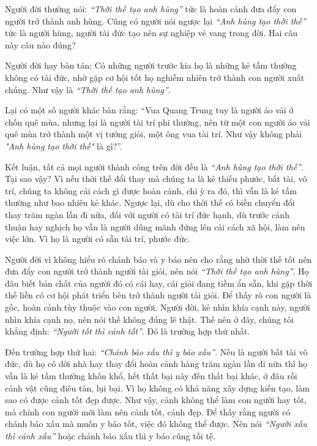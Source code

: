 \documentclass[
  12pt,
  oneside]{book}
\begin{document}
Người đời thường nói: \emph{``Thời thế tạo anh hùng''} tức là hoàn cảnh đưa đẩy con người trở thành anh hùng. Cũng có người nói ngược lại \emph{``Anh hùng tạo thời thế''} tức là người hùng, người tài đức tạo nên sự nghiệp vẻ vang trong đời. Hai câu này câu nào đúng?

Người đời hay bàn tán: Có những người trước kia họ là những kẻ tầm thường không có tài đức, nhờ gặp cơ hội tốt họ nghiễm nhiên trở thành con người xuất chúng. Như vậy là \emph{``Thời thế tạo anh hùng''}.

Lại có một số người khác bàn rằng: ``Vua Quang Trung tuy là người áo vải ở chốn quê mùa, nhưng lại là người tài trí phi thường, nên từ một con người áo vải quê mùa trở thành một vị tướng giỏi, một ông vua tài trí. Như vậy không phải \emph{"Anh hùng tạo thời thế"} là gì?''.

Kết luận, tất cả mọi người thành công trên đời đều là \emph{``Anh hùng tạo thời thế''}. Tại sao vậy? Vì nếu thời thế đổi thay mà chúng ta là kẻ thiếu phước, bất tài, vô trí, chúng ta không cải cách gì được hoàn cảnh, chỉ ỳ ra đó, thì vẫn là kẻ tầm thường như bao nhiêu kẻ khác. Ngược lại, dù cho thời thế có biến chuyển đổi thay trăm ngàn lần đi nữa, đối với người có tài trí đức hạnh, dù trước cảnh thuận hay nghịch họ vẫn là người dũng mãnh đứng lên cải cách xã hội, làm nên việc lớn. Vì họ là người có sẵn tài trí, phước đức.

Người đời vì không hiểu rõ chánh báo và y báo nên cho rằng nhờ thời thế tốt nên đưa đẩy con người trở thành người tài giỏi, nên nói \emph{``Thời thế tạo anh hùng''}. Họ đâu biết bản chất của người đó có cái hay, cái giỏi đang tiềm ẩn sẵn, khi gặp thời thế liền có cơ hội phát triển bèn trở thành người tài giỏi. Để thấy rõ con người là gốc, hoàn cảnh tùy thuộc vào con người. Người đời, kẻ nhìn khía cạnh này, người nhìn khía cạnh nọ, nên nói thế không đúng lẽ thật. Thế nên ở đây, chúng tôi khẳng định: \emph{``Người tốt thì cảnh tốt''}. Đó là trường hợp thứ nhất.

Đến trường hợp thứ hai: \emph{``Chánh báo xấu thì y báo xấu''}. Nếu là người bất tài vô đức, dù họ có dời nhà hay thay đổi hoàn cảnh hàng trăm ngàn lần đi nữa thì họ vẫn là kẻ tầm thường khốn khổ, hết thất bại này đến thất bại khác, ở đâu rồi cảnh vật cũng điêu tàn, lụi bại. Vì họ không có khả năng xây dựng kiến tạo, làm sao có được cảnh tốt đẹp được. Như vậy, cảnh không thể làm con người hay tốt, mà chính con người mới làm nên cảnh tốt, cảnh đẹp. Để thấy rằng người có chánh báo xấu mà muốn y báo tốt, việc đó không thể được. Nên nói \emph{``Người xấu thì cảnh xấu''} hoặc chánh báo xấu thì y báo cũng tồi tệ.
\end{document}
